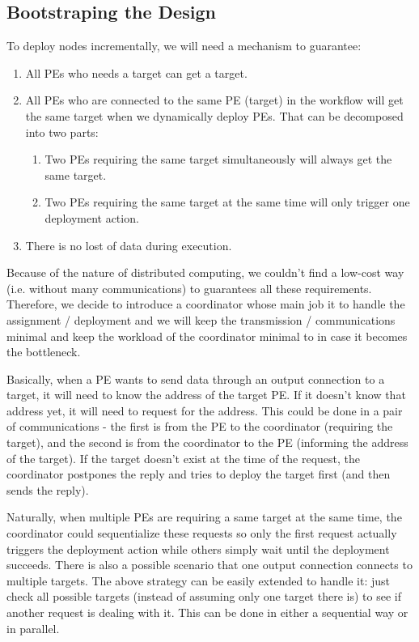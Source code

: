 \documentclass[•]{article}
\begin{document}
	\subsection{Bootstraping the Design}
	To deploy nodes incrementally, we will need a mechanism to guarantee:
	\begin{enumerate}
		\item All PEs who needs a target can get a target.
		\item All PEs who are connected to the same PE (target) in the workflow will get the same target when we dynamically deploy PEs. That can be decomposed into two parts:
		\begin{enumerate}
			\item Two PEs requiring  the same target simultaneously will always get the same target.
			\item Two PEs requiring the same target at the same time will only trigger one deployment action.
		\end{enumerate}
		\item There is no lost of data during execution.
	\end{enumerate}
	
	Because of the nature of distributed computing, we couldn't find a low-cost way (i.e. without many communications) to guarantees all these requirements. Therefore, we decide to introduce a coordinator whose main job it to handle the assignment / deployment and we will keep the transmission / communications minimal and keep the workload of the coordinator minimal to in case it becomes the bottleneck.
	
	Basically, when a PE wants to send data through an output connection to a target, it will need to know the address of the target PE. If it doesn't know that address yet, it will need to request for the address. This could be done in a pair of communications - the first is from the PE to the coordinator (requiring the target), and the second is from the coordinator to the PE (informing the address of the target). If the target doesn't exist at the time of the request, the coordinator postpones the reply and tries to deploy the target first (and then sends the reply).
	
	Naturally, when multiple PEs are requiring a same target at the same time, the coordinator could sequentialize these requests so only the first request actually triggers the deployment action while others simply wait until the deployment succeeds. There is also a possible scenario that one output connection connects to multiple targets. The above strategy can be easily extended to handle it: just check all possible targets (instead of assuming only one target there is) to see if another request is dealing with it. This can be done in either a sequential way or in parallel.
	
\end{document}

